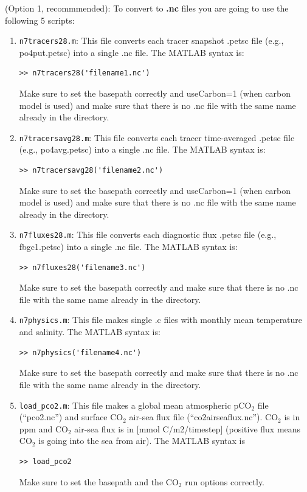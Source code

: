 \documentclass[a4paper]{article}
\def\noin{\noindent }
\begin{document}
\vspace{5mm}
\noin (Option 1, recommmended): To convert to \textbf{.nc} files you are going to use the following 5 scripts:
\begin{enumerate}
\item \verb|n7tracers28.m|: This file converts each tracer snapshot .petsc file (e.g., po4put.petsc) into a single .nc file. The MATLAB syntax is:
\begin{lstlisting}[style=DOS]
 >> n7tracers28('filename1.nc')
\end{lstlisting}
Make sure to set the basepath correctly and useCarbon=1 (when carbon model is used) and make sure that there is no .nc file with the same name already in the directory.

\item\verb|n7tracersavg28.m|: This file converts each tracer time-averaged .petsc file (e.g., po4avg.petsc) into a single .nc file. The MATLAB syntax is:
\begin{lstlisting}[style=DOS]
 >> n7tracersavg28('filename2.nc')
\end{lstlisting}
Make sure to set the basepath correctly and useCarbon=1 (when carbon model is used) and make sure that there is no .nc file with the same name already in the directory.

\item\verb|n7fluxes28.m|: This file converts each diagnostic flux .petsc file (e.g., fbgc1.petsc) into a single .nc file. The MATLAB syntax is:
\begin{lstlisting}[style=DOS]
 >> n7fluxes28('filename3.nc')
\end{lstlisting}
Make sure to set the basepath correctly and make sure that there is no .nc file with the same name already in the directory.

\item\verb|n7physics.m|: This file makes single .c files with monthly mean temperature and salinity. The MATLAB syntax is:
\begin{lstlisting}[style=DOS]
 >> n7physics('filename4.nc')
\end{lstlisting}
Make sure to set the basepath correctly and make sure that there is no .nc file with the same name already in the directory.

\item\verb|load_pco2.m|: This file makes a global mean atmospheric $\mathrm{pCO_{2}}$ file (``pco2.nc'') and surface $\mathrm{CO_{2}}$ air-sea flux file (``co2airseaflux.nc''). $\mathrm{CO_{2}}$ is in ppm and $\mathrm{CO_{2}}$ air-sea flux is in [mmol C/m2/timestep] (positive flux means $\mathrm{CO_{2}}$ is going into the sea from air). The MATLAB syntax is 
\begin{lstlisting}[style=DOS]
 >> load_pco2
\end{lstlisting}
Make sure to set the basepath and the $\mathrm{CO_{2}}$ run options correctly.


\end{enumerate}
\end{document}
